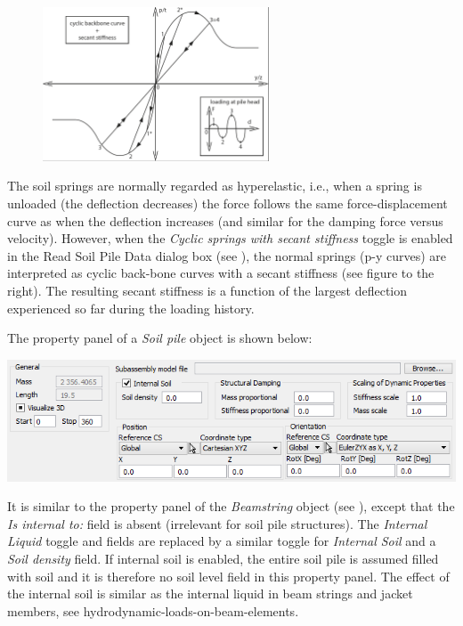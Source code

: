 \begin{figure}
  \baselineskip
  \includegraphics[trim=0 4 3 0,clip,width=0.6\textwidth]{Figures/4a-SoilSpring}
\end{figure}

The soil springs are normally regarded as hyperelastic, i.e., when a spring is
unloaded (the deflection decreases) the force follows the same
force-displacement curve as when the deflection increases (and similar for the
damping force versus velocity). However, when the {\sl Cyclic springs with
secant stiffness} toggle is enabled in the Read Soil Pile Data dialog box
(see ),
the normal springs (p-y curves) are interpreted as cyclic back-bone curves with
a secant stiffness (see figure to the right).
The resulting secant stiffness is a function of the largest deflection
experienced so far during the loading history.



The property panel of a {\sl Soil pile} object is shown below:

\noindent\includegraphics[width=\textwidth]{Figures/4a-SoilProperty}

It is similar to the property panel of the {\sl Beamstring} object
(see ), except that
the {\sl Is internal to:} field is absent (irrelevant for soil pile structures).
The {\sl Internal Liquid} toggle and fields are replaced by a similar toggle for
{\sl Internal Soil} and a {\sl Soil density} field.
If internal soil is enabled, the entire soil pile is assumed filled with soil
and it is therefore no soil level field in this property panel.
The effect of the internal soil is similar as the internal liquid in beam
strings and jacket members, see
{hydrodynamic-loads-on-beam-elements}.

